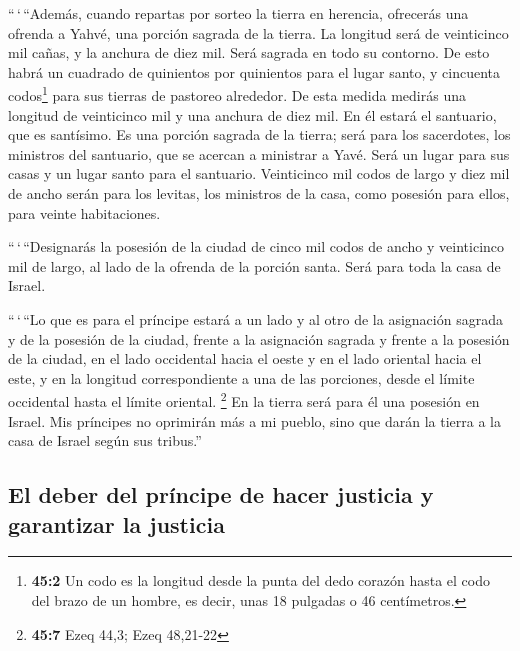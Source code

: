 \begin{paracol}{2}
 ``\,`\,``Además, cuando repartas por sorteo la tierra en
herencia, ofrecerás una ofrenda a Yahvé, una porción sagrada de la
tierra. La longitud será de veinticinco mil cañas, y la anchura de diez
mil. Será sagrada en todo su contorno.  De esto habrá un
cuadrado de quinientos por quinientos para el lugar santo, y cincuenta
codos\footnote{\textbf{45:2} Un codo es la longitud desde la punta del
  dedo corazón hasta el codo del brazo de un hombre, es decir, unas 18
  pulgadas o 46 centímetros.} para sus tierras de pastoreo alrededor.
 De esta medida medirás una longitud de veinticinco mil y
una anchura de diez mil. En él estará el santuario, que es santísimo.
 Es una porción sagrada de la tierra; será para los
sacerdotes, los ministros del santuario, que se acercan a ministrar a
Yavé. Será un lugar para sus casas y un lugar santo para el santuario.
 Veinticinco mil codos de largo y diez mil de ancho serán
para los levitas, los ministros de la casa, como posesión para ellos,
para veinte habitaciones.

 ``\,`\,``Designarás la posesión de la ciudad de cinco mil
codos de ancho y veinticinco mil de largo, al lado de la ofrenda de la
porción santa. Será para toda la casa de Israel.

 ``\,`\,``Lo que es para el príncipe estará a un lado y al
otro de la asignación sagrada y de la posesión de la ciudad, frente a la
asignación sagrada y frente a la posesión de la ciudad, en el lado
occidental hacia el oeste y en el lado oriental hacia el este, y en la
longitud correspondiente a una de las porciones, desde el límite
occidental hasta el límite oriental. \footnote{\textbf{45:7} Ezeq 44,3;
  Ezeq 48,21-22}  En la tierra será para él una posesión
en Israel. Mis príncipes no oprimirán más a mi pueblo, sino que darán la
tierra a la casa de Israel según sus tribus.''

\hypertarget{el-deber-del-pruxedncipe-de-hacer-justicia-y-garantizar-la-justicia}{%
\subsection{El deber del príncipe de hacer justicia y garantizar la
justicia}\label{el-deber-del-pruxedncipe-de-hacer-justicia-y-garantizar-la-justicia}}


\end{paracol}
